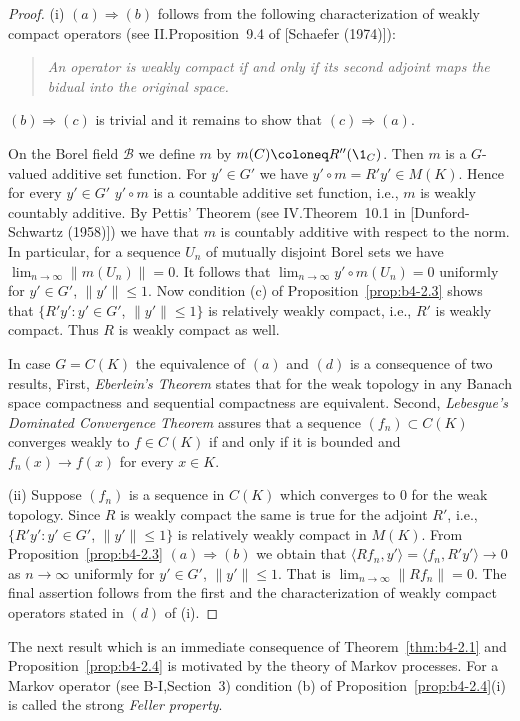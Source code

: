 \begin{proof}
	(i) $(a)\Rightarrow(b)$ follows from the following characterization of
	weakly compact operators (see \eg II.Proposition~9.4 of [Schaefer (1974)]):
	\begin{quote}
		\emph{
			An operator is weakly compact if and only if its second adjoint
		maps the bidual into the original space.
		}
	\end{quote}
	$(b)\Rightarrow(c)$ is trivial and it remains to show that $(c) \Rightarrow (a)$.
	
	On the Borel field $\mathcal{B}$ we define $m$ by $m(C)  \coloneq  R''(\1_C)$.
	Then $m$ is
	a $G$-valued additive set function.
	For $y' \in G'$ we have
	$y'\circ m = R'y' \in M(K)$.
	Hence for every $y' \in G'$ $y'\circ m$ is a countable
	additive set function, i.e., $m$ is weakly countably additive.
	By
	Pettis' Theorem (see IV.Theorem~10.1 in 
	[Dunford-Schwartz (1958)]) we have
	that $m$ is countably additive with respect to the norm.
	In particular, for a sequence $U_n$ of mutually disjoint Borel sets we have
	$\lim_{n\to\infty}\|m(U_n)\| = 0$.
	It follows that $\lim_{n\to\infty}y'\circ m(U_n) = 0$ uniformly for
	$y' \in G'$, $\|y'\| \leq 1$.
	Now condition (c) of Proposition~\ref{prop:b4-2.3} shows that $\{R'y'
	\colon y' \in G'$, $\|y'\| \leq 1\}$ is relatively weakly compact, i.e., $R'$ is
	weakly compact.
	Thus $R$ is weakly compact as well.
	
	In case $G = C(K)$ the equivalence of $(a)$ and $(d)$ is a consequence of
	two results, First, \emph{Eberlein's Theorem} states that for the weak topology in any Banach space compactness and sequential compactness are
	equivalent.
	Second, \emph{Lebesgue's Dominated Convergence Theorem} assures
	that a sequence $(f_n) \subset C(K)$ converges weakly to $f \in C(K)$ if and
	only if it is bounded and $f_n(x) \to f(x)$ for every $x \in K$.
	
	(ii) Suppose $(f_n)$ is a sequence in $C(K)$ which converges to $0$ for
	the weak topology.
	Since $R$ is weakly compact the same is true for
	the adjoint $R'$, i.e., $\{R'y' \colon y' \in G'$, $\|y'\| \leq 1\}$ is relatively
	weakly compact in $M(K)$.
	From Proposition~\ref{prop:b4-2.3} $(a)\Rightarrow(b)$ we obtain that
	$\langle Rf_n,y'\rangle = \langle f_n,R'y'\rangle \to 0$ as $n \to \infty$ uniformly for $y' \in G'$, $\|y'\|\leq1$.
	That is $\lim_{n\to\infty}\|Rf_n\| = 0$.
	The final assertion follows from the first and the characterization of
	weakly compact operators stated in $(d)$ of (i).
\end{proof}
%
%
%
\newpage
%
The next result which is an immediate consequence of Theorem~\ref{thm:b4-2.1} and
Proposition~\ref{prop:b4-2.4} is motivated by the theory of Markov processes.
For a Markov
operator (see B-I,Section~3) condition (b) of Proposition~\ref{prop:b4-2.4}(i) is called the
strong \emph{Feller property}.

